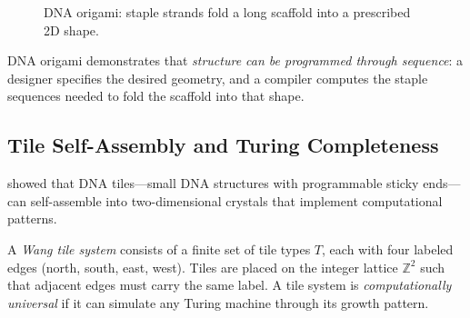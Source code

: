 \begin{figure}[H]
\centering
{}
\caption{DNA origami: staple strands fold a long scaffold into a prescribed 2D shape.}
\label{fig:dna-origami}
\end{figure}

DNA origami demonstrates that \emph{structure can be programmed through sequence}: a designer specifies the desired geometry, and a compiler computes the staple sequences needed to fold the scaffold into that shape.

\subsection{Tile Self-Assembly and Turing Completeness}

\citet{winfree1998} showed that DNA tiles---small DNA structures with programmable sticky ends---can self-assemble into two-dimensional crystals that implement computational patterns.

\begin{definition}
A \emph{Wang tile system} consists of a finite set of tile types $T$, each with four labeled edges (north, south, east, west). Tiles are placed on the integer lattice $\mathbb{Z}^2$ such that adjacent edges must carry the same label. A tile system is \emph{computationally universal} if it can simulate any Turing machine through its growth pattern.
\end{definition}

